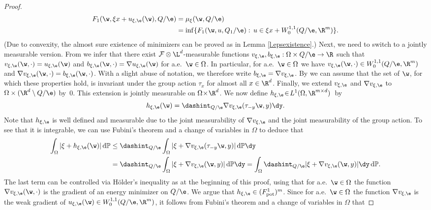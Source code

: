 \begin{proof}
\begin{align*}
F_1(\w,\xi x+u_{\xi,\e}(\w),Q/\e)&=\mu_{\xi}(\w,Q/\e)
\\
&=\inf\{F_1(\w,u,Q_1/\e):\,u\in \xi x+W^{1,1}_0(Q/\e,\R^m)\}.
\end{align*}
(Due to convexity, the almost sure existence of minimizers can be proved as in Lemma \ref{l.epsexistence}.) Next, we need to switch to a jointly measurable version. From \cite[Lem.\,16, p.\,196]{DS} we infer that there exist $\mathcal{F}\otimes\L^d$-measurable functions $v_{\xi,\e},b_{\xi,\e}:\Omega\times\nobreak Q/\e\to\R$ such that $v_{\xi,\e}(\w,\cdot)=u_{\xi,\e}(\w)$ and $b_{\xi,\e}(\w,\cdot)=\nabla u_{\xi,\e}(\w)$ for a.e.\ $\w\in\Omega$. In particular, for a.e.\ $\w\in\Omega$ we have $v_{\xi,\e}(\w,\cdot)\in W_0^{1,1}(Q/\e,\R^m)$ and $\nabla v_{\xi,\e}(\w,\cdot)=b_{\xi,\e}(\w,\cdot)$. With a slight abuse of notation, we therefore write $b_{\xi,\e}=\nabla v_{\xi,\e}$. By \cite[Lem.\,7.1]{JKO} we can assume that the set of $\w$, for which these properties hold, is invariant under the group action $\tau_{x}$ for almost all $x\in\R^d$. Finally, we extend $v_{\xi,\e}$ and $\nabla v_{\xi,\e}$ to $\Omega\times(\R^d\setminus Q/\e)$ by~$0$. This extension is jointly measurable on $\Omega\!\times\!\R^d$. We now define $h_{\xi,\e}\!\in\! L^1(\Omega,\R^{m\times d})$~by
\begin{equation*}
h_{\xi,\e}(\w)=\dashint_{Q/\e}\nabla v_{\xi,\e}(\tau_{-y}\w,y)\dy.
\end{equation*}
Note that $h_{\xi,\e}$ is well defined and measurable due to the joint measurability of $\nabla v_{\xi,\e}$ and the joint measurability of the group action. To see that it is integrable, we can use Fubini's theorem and a change of variables in $\Omega$ to deduce that
\begin{align*}
\int_{\Omega}|\xi+h_{\xi,\e}(\w)|\,\mathrm{d}\mathbb{P}&\leq \dashint_{Q/\e}\int_{\Omega}|\xi+\nabla v_{\xi,\e}(\tau_{-y}\w,y)|\,\mathrm{d}\mathbb{P}\dy
\\
&=\dashint_{Q/\e}\int_{\Omega}|\xi+\nabla v_{\xi,\e}(\w,y)|\,\mathrm{d}\mathbb{P}\dy
=\int_{\Omega}\dashint_{Q/\e}|\xi+\nabla v_{\xi,\e}(\w,y)|\dy\,\mathrm{d}\mathbb{P}.
\end{align*}
The last term can be controlled via Hölder's inequality as at the beginning of this proof, using that for a.e.\ $\w\in\Omega$ the function $\nabla v_{\xi,\e}(\w,\cdot)$ is the gradient of an energy minimizer on $Q/\e$. We argue that $h_{\xi,\e}\in (F_\mathrm{pot}^1)^m$. Since for a.e.\ $\w\in\Omega$ the function $\nabla v_{\xi,\e}$ is the weak gradient of $u_{\xi,\e}(\w)\in W^{1,1}_0(Q/\e,\R^m)$, it follows from Fubini's theorem and a change of variables in $\Omega$ that

\end{proof}
